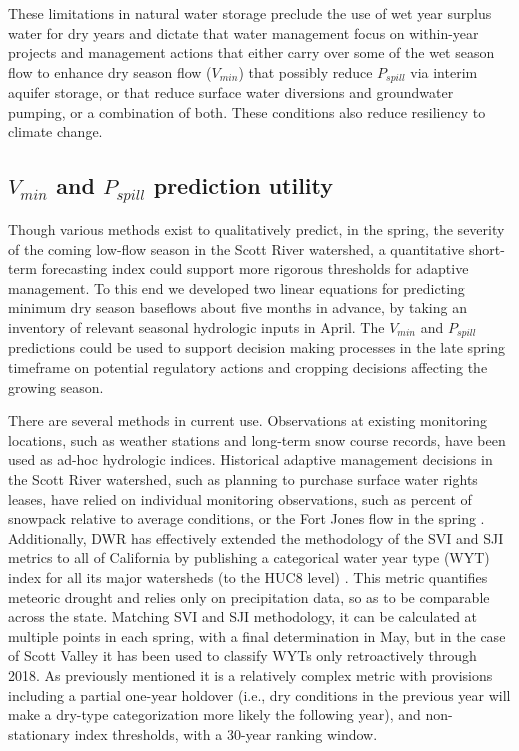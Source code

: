 \documentclass[hess, manuscript]{copernicus}
\begin{document}
These limitations in natural water storage preclude the use of wet year
surplus water for dry years and dictate that water management focus on
within-year projects and management actions that either carry over some
of the wet season flow to enhance dry season flow (\(V_{min}\)) that
possibly reduce \(P_{spill}\) via interim aquifer storage, or that
reduce surface water diversions and groundwater pumping, or a
combination of both. These conditions also reduce resiliency to climate
change.

\subsection{\texorpdfstring{\(V_{min}\) and \(P_{spill}\) prediction
utility}{V\_\{min\} and P\_\{spill\} prediction utility}}

Though various methods exist to qualitatively predict, in the spring,
the severity of the coming low-flow season in the Scott River watershed,
a quantitative short-term forecasting index could support more rigorous
thresholds for adaptive management. To this end we developed two linear
equations for predicting minimum dry season baseflows about five months
in advance, by taking an inventory of relevant seasonal hydrologic
inputs in April. The \(V_{min}\) and \(P_{spill}\) predictions could be
used to support decision making processes in the late spring timeframe
on potential regulatory actions and cropping decisions affecting the
growing season.

There are several methods in current use. Observations at existing
monitoring locations, such as weather stations and long-term snow course
records, have been used as ad-hoc hydrologic indices. Historical
adaptive management decisions in the Scott River watershed, such as
planning to purchase surface water rights leases, have relied on
individual monitoring observations, such as percent of snowpack relative
to average conditions, or the Fort Jones flow in the spring
\citeyearpar[e.g., SRWT][]{SRWT2018}. Additionally, DWR has effectively
extended the methodology of the SVI and SJI metrics to all of California
by publishing a categorical water year type (WYT) index for all its
major watersheds (to the HUC8 level) \citeyearpar[DWR][]{DWR2021a}. This
metric quantifies meteoric drought and relies only on precipitation
data, so as to be comparable across the state. Matching SVI and SJI
methodology, it can be calculated at multiple points in each spring,
with a final determination in May, but in the case of Scott Valley it
has been used to classify WYTs only retroactively through 2018. As
previously mentioned it is a relatively complex metric with provisions
including a partial one-year holdover (i.e., dry conditions in the
previous year will make a dry-type categorization more likely the
following year), and non-stationary index thresholds, with a 30-year
ranking window.
\end{document}
